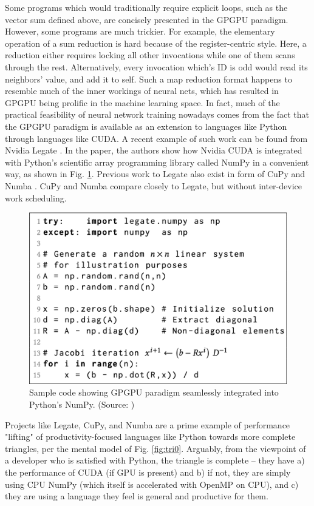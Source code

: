 \documentclass{IEEEtran}
\begin{document}
Some programs which would traditionally require explicit loops, such as the vector sum defined above, are concisely presented in the GPGPU paradigm. However, some programs are much trickier. For example, the elementary operation of a sum reduction is hard because of the register-centric style. Here, a reduction either requires locking all other invocations while one of them scans through the rest. Alternatively, every invocation which's ID is odd would read its neighbors' value, and add it to self. Such a map reduction format happens to resemble much of the inner workings of neural nets, which has resulted in GPGPU being prolific in the machine learning space. In fact, much of the practical feasibility of neural network training nowadays comes from the fact that the GPGPU paradigm is available as an extension to languages like Python through languages like CUDA. A recent example of such work can be found from Nvidia Legate \cite{bauer2019legate}. In the paper, the authors show how Nvidia \gls{CUDA} is integrated with Python's scientific array programming library called NumPy in a convenient way, as shown in Fig. \ref{fig:legint}. Previous work to Legate also exist in form of CuPy \cite{okuta2017cupy} and Numba \cite{lam2015numba}. CuPy and Numba compare closely to Legate, but without inter-device work scheduling.

\begin{figure}
  \centering
  \includegraphics[width=\columnwidth]{legint.png}
  \caption{Sample code showing GPGPU paradigm seamlessly integrated into Python's NumPy. (Source: \cite{bauer2019legate})}
  \label{fig:legint}
\end{figure}

Projects like Legate, CuPy, and Numba are a prime example of performance "lifting" of productivity-focused languages like Python towards more complete triangles, per the mental model of Fig. \ref{fig:tri0}. Arguably, from the viewpoint of a developer who is satisfied with Python, the triangle is complete -- they have a) the performance of CUDA (if GPU is present) and b) if not, they are simply using CPU NumPy (which itself is accelerated with OpenMP on CPU), and c) they are using a language they feel is general and productive for them.
\end{document}
